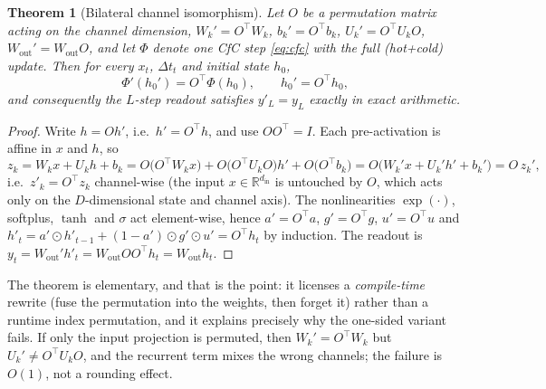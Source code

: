 \documentclass[11pt]{article}
\newtheorem{theorem}{Theorem}
\theoremstyle{definition}
\newcommand{\R}{\mathbb{R}}
\newcommand{\code}[1]{\texttt{\detokenize{#1}}}
\begin{document}
\begin{theorem}[Bilateral channel isomorphism]\label{thm:iso}
Let $O$ be a permutation matrix acting on the \emph{channel} dimension, $W_k' = O^\top W_k$,
$b_k'=O^\top b_k$, $U_k' = O^\top U_kO$, $W_{\text{out}}' = W_{\text{out}}O$, and let $\Phi$ denote one CfC
step \eqref{eq:cfc} with the full (hot+cold) update. Then for every $x_t$, $\Delta t_t$ and initial state
$h_0$,
\[
\Phi'(h_0') = O^\top \Phi(h_0), \qquad h_0' = O^\top h_0,
\]
and consequently the $L$-step readout satisfies $y'_L = y_L$ exactly in exact arithmetic.
\end{theorem}

\begin{proof}
Write $h = Oh'$, i.e.\ $h' = O^\top h$, and use $O O^\top = I$. Each pre-activation is affine in
$x$ and $h$, so
\[
z_k = W_kx + U_kh + b_k = O\big(O^\top W_k x\big) + O\big(O^\top U_k O\big)h' + O\big(O^\top b_k\big)
    = O\big(W_k'x + U_k'h' + b_k'\big) = O\,z_k',
\]
i.e.\ $z'_k = O^\top z_k$ channel-wise (the input $x\in\R^{d_{\text{in}}}$ is untouched by $O$, which acts
only on the $D$-dimensional state and channel axis). The nonlinearities $\exp(\cdot)$, softplus, $\tanh$ and
$\sigma$ act element-wise, hence $a'=O^\top a$, $g'=O^\top g$, $u'=O^\top u$ and
$h'_t = a'\odot h'_{t-1} + (1-a')\odot g'\odot u' = O^\top h_t$ by induction. The readout is
$y_t = W_{\text{out}}'h'_t = W_{\text{out}}OO^\top h_t = W_{\text{out}}h_t$.
\end{proof}

The theorem is elementary, and that is the point: it licenses a \emph{compile-time} rewrite (fuse the
permutation into the weights, then forget it) rather than a runtime index permutation, and it explains
precisely why the one-sided variant fails. If only the input projection is permuted, then
$W_k' = O^\top W_k$ but $U_k' \neq O^\top U_kO$, and the recurrent term mixes the wrong channels; the failure is
$O(1)$, not a rounding effect.

\begin{table}[tbp]
\centering
\caption{Bilateral isomorphism gate. ``Worst'' is the maximum relative $L_2$ error over all ten orders
(identity, five random, variance, weight-norm, jacobian-coactivation, and two shuffles) on the state
trajectory; the one-sided column applies the same orders to the input projection only and leaves the recurrent
tensor untouched. Gate: fp64 $<10^{-13}$, fp32 $<10^{-6}$, one-sided $>0.5$
(\code{results/phase1_isomorphism.json}).}
\label{tab:iso}


\end{table}
\end{document}
